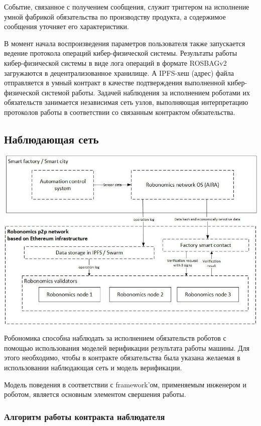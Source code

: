 \documentclass{article}
\begin{document}
Событие, связанное с получением сообщения, служит триггером на исполнение умной фабрикой обязательства по производству продукта, а содержимое сообщения уточняет его характеристики.

В момент начала воспроизведения параметров пользователя также запускается ведение протокола операций кибер-физической системы. Результаты работы кибер-физической системы в виде лога операций в формате ROSBAGv2 загружаются в децентрализованное хранилище. А IPFS-хеш (адрес) файла отправляется в умный контракт в качестве подтверждения выполненной кибер-физической системой работы. Задачей наблюдения за исполнением роботами их обязательств занимается независимая сеть узлов, выполняющая интерпретацию протоколов работы в соответствии со связанным контрактом обязательства.

\subsection{Наблюдающая сеть}

\includegraphics[width=1\textwidth]{app-3.png} 

Робономика способна наблюдать за исполнением обязательств роботов с помощью использования моделей верификации результата работы машины. Для этого необходимо, чтобы в контракте обязательства была указана желаемая в использовании наблюдающая сеть и модель верификации.

Модель поведения в соответствии с framework’ом, применяемым инженером и роботом, является основным элементом свершения работы.  

\subsubsection{Алгоритм работы контракта наблюдателя}
\end{document}
